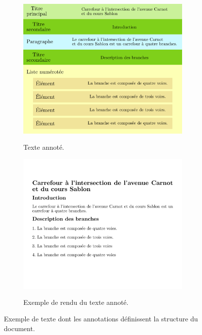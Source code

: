 \begin{figure}[ht]
    \centering
    \begin{subfigure}{0.49\textwidth}
        \includegraphics[width=0.95\textwidth]{images/description/exemple_texte_augmente_1.pdf}
        \label{fig:desc_ex_texte_annoté_1}
        \caption{Texte annoté.}
    \end{subfigure}
    \begin{subfigure}{0.49\textwidth}
        \includegraphics[width=0.95\textwidth]{images/description/exemple_texte_augmente_2.pdf}
        \label{fig:desc_ex_texte_annoté_2}
        \caption{Exemple de rendu du texte annoté.}
    \end{subfigure}
    \caption[Exemple de texte annoté.]{Exemple de texte dont les annotations définissent la structure du document.}
    \label{fig:desc_ex_texte_annoté}
\end{figure}

